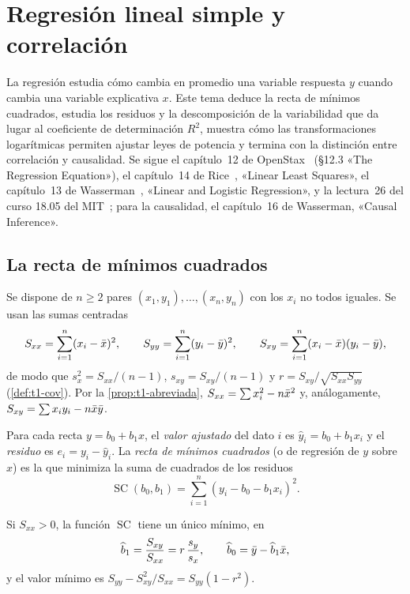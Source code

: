 \chapter{Regresión lineal simple y correlación}
\label{tema:6}

La regresión estudia cómo cambia en promedio una variable respuesta $y$ cuando cambia una variable explicativa $x$. Este tema deduce la recta de mínimos cuadrados, estudia los residuos y la descomposición de la variabilidad que da lugar al coeficiente de determinación $R^{2}$, muestra cómo las transformaciones logarítmicas permiten ajustar leyes de potencia y termina con la distinción entre correlación y causalidad. Se sigue el capítulo~12 de OpenStax~\cite{openstax} (§12.3 «The Regression Equation»), el capítulo~14 de Rice~\cite{rice}, «Linear Least Squares», el capítulo~13 de Wasserman~\cite{wasserman}, «Linear and Logistic Regression», y la lectura~26 del curso 18.05 del MIT~\cite{mit1805}; para la causalidad, el capítulo~16 de Wasserman, «Causal Inference».

\section{La recta de mínimos cuadrados}

Se dispone de $n\ge2$ pares $(x_1,y_1),\dots,(x_n,y_n)$ con los $x_i$ no todos iguales. Se usan las sumas centradas
\[
S_{xx}=\sum_{i=1}^{n}(x_i-\bar{x})^{2},\qquad S_{yy}=\sum_{i=1}^{n}(y_i-\bar{y})^{2},\qquad S_{xy}=\sum_{i=1}^{n}(x_i-\bar{x})(y_i-\bar{y}),
\]
de modo que $s_x^{2}=S_{xx}/(n-1)$, $s_{xy}=S_{xy}/(n-1)$ y $r=S_{xy}/\sqrt{S_{xx}S_{yy}}$ (\cref{def:t1-cov}). Por la \cref{prop:t1-abreviada}, $S_{xx}=\sum x_i^{2}-n\bar{x}^{2}$ y, análogamente, $S_{xy}=\sum x_iy_i-n\bar{x}\bar{y}$.

\begin{definicion}\label{def:t6-mc}
Para cada recta $y=b_0+b_1x$, el \emph{valor ajustado} del dato $i$ es $\widehat y_i=b_0+b_1x_i$ y el \emph{residuo} es $e_i=y_i-\widehat y_i$. La \emph{recta de mínimos cuadrados} (o de regresión de $y$ sobre $x$) es la que minimiza la suma de cuadrados de los residuos
\[
\operatorname{SC}(b_0,b_1)=\sum_{i=1}^{n}(y_i-b_0-b_1x_i)^{2}.
\]
\end{definicion}

\begin{teorema}\label{teo:t6-mc}
Si $S_{xx}>0$, la función $\operatorname{SC}$ tiene un único mínimo, en
\[
\widehat b_1=\frac{S_{xy}}{S_{xx}}=r\,\frac{s_y}{s_x},\qquad\widehat b_0=\bar{y}-\widehat b_1\bar{x},
\]
y el valor mínimo es $S_{yy}-S_{xy}^{2}/S_{xx}=S_{yy}(1-r^{2})$.
\end{teorema}

